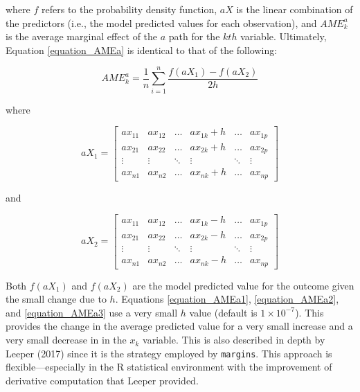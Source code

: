 \documentclass[]{DissertateUSU}
\begin{document}
\noindent where \(f\) refers to the probability density function,
\(a X\) is the linear combination of the predictors (i.e., the model
predicted values for each observation), and \(AME_k^a\) is the average
marginal effect of the \(a\) path for the \(kth\) variable. Ultimately,
Equation \ref{equation_AMEa} is identical to that of the following:

\begin{equation}\label{equation_AMEa1}
AME^a_k = \frac{1}{n} \sum_{i=1}^n \frac{f(aX_1) - f(aX_2)}{2h}
\end{equation}

\noindent where

\begin{equation}\label{equation_AMEa2}
aX_1 = \begin{bmatrix}
ax_{11} & ax_{12} & \dots & ax_{1k} + h & \dots & ax_{1p} \\
ax_{21} & ax_{22} & \dots & ax_{2k} + h & \dots & ax_{2p} \\
\vdots  & \vdots  & \ddots & \vdots     & \ddots  & \vdots \\
ax_{n1} & ax_{n2} & \dots & ax_{nk} + h & \dots & ax_{np}
\end{bmatrix}
\end{equation}

\noindent and

\begin{equation}\label{equation_AMEa3}
aX_2 = \begin{bmatrix}
ax_{11} & ax_{12} & \dots & ax_{1k} - h & \dots & ax_{1p} \\
ax_{21} & ax_{22} & \dots & ax_{2k} - h & \dots & ax_{2p} \\
\vdots  & \vdots  & \ddots & \vdots     & \ddots  & \vdots \\
ax_{n1} & ax_{n2} & \dots & ax_{nk} - h & \dots & ax_{np}
\end{bmatrix}
\end{equation}

\noindent Both \(f(aX_1)\) and \(f(aX_2)\) are the model predicted value
for the outcome given the small change due to \(h\). Equations
\ref{equation_AMEa1}, \ref{equation_AMEa2}, and \ref{equation_AMEa3} use
a very small \(h\) value (default is \(1 \times 10^{-7}\)). This
provides the change in the average predicted value for a very small
increase and a very small decrease in in the \(x_k\) variable. This is
also described in depth by Leeper (2017) since it is the strategy
employed by \texttt{margins}. This approach is flexible---especially in
the R statistical environment with the improvement of derivative
computation that Leeper provided.
\end{document}

